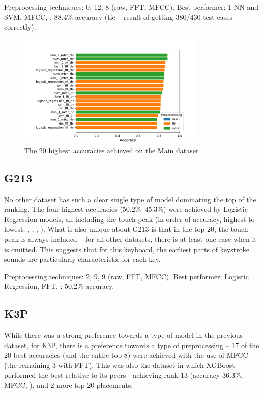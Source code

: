 \documentclass[../main.tex]{subfiles}
\begin{document}
Preprocessing techniques: 0, 12, 8 (raw, FFT, MFCC).
Best performer: 1-NN and SVM, MFCC, : 88.4\% accuracy (tie -- result of getting 380/430 test cases correctly).

\begin{figure}[H]
    \centering
    \includegraphics[width=0.8\textwidth]{figures/plots/best_acc_per_dataset/main_dataset.pdf}
    \caption{The 20 highest accuracies achieved on the Main dataset}
    \label{fig:best_acc_per_dataset_main}
\end{figure}

%
\subsection{G213}
No other dataset has such a clear single type of model dominating the top of the ranking. The four highest accuracies (50.2\%--45.3\%) were achieved by Logistic Regression models, all including the touch peak (in order of accuracy, highest to lowest: , , , ). What is also unique about G213 is that in the top 20, the touch peak is always included -- for all other datasets, there is at least one case when it is omitted. This suggests that for this keyboard, the earliest parts of keystroke sounds are particularly characteristic for each key.

Preprocessing techniques: 2, 9, 9 (raw, FFT, MFCC).
Best performer: Logistic Regression, FFT, : 50.2\% accuracy.
%

\subsection{K3P}
\label{sec:results_K3P}
While there was a strong preference towards a type of model in the previous dataset, for K3P, there is a preference towards a type of preprocessing -- 17 of the 20 best accuracies (and the entire top 8) were achieved with the use of MFCC (the remaining 3 with FFT). This was also the dataset in which XGBoost performed the best relative to its peers - achieving rank 13 (accuracy 36.3\%, MFCC, ), and 2 more top 20 placements. 
\end{document}
